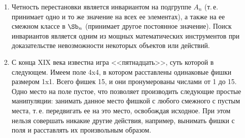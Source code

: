 \begin{enumerate}
\begin{table}[h!]
\begin{tabular}{c||c}
\footnotesize %
\begin{tabular}{cc|cc}
 $\id$    & (12)(34) & (13)(24) & (14)(23) \\[5pt]
 (12)(34) & $\id$    & (14)(23) & (13)(24) \\[3pt]\hline
 &&& \\[-5pt]
 (13)(24) & (14)(23) & $\id$    & (12)(34) \\[5pt]
 (14)(23) & (13)(24) & (12)(34) & $\id$
\end{tabular}
 &
\begin{tabular}{c|cccc}
$\sqrt[4]{1}$ & 1    & $i$  & $-1$ & $-i$ \\  \hline
1             & 1    & $i$  & $-1$ & $-i$ \\
$i$           & $i$  & $-1$ & $-i$ & 1    \\
$-1$          & $-1$ & $-i$ & 1    & $i$  \\
$-i$          & $-i$ & 1    & $i$  & $-1$
\end{tabular}
\\
\\

\hline

\end{tabular}
\caption{}\label{vier}
\end{table}

Отметим, что с точностью до изоморфизма существует всего две группы 4-го порядка: группа Клейна и циклическая группа. Несмотря на все разнообразие их представителей!




\subsection*{Игра <<Пятнадцать>>}


\item Четность перестановки является инвариантом на подгруппе $A_n$ (т.\,е. принимает одно и то же значение на всех ее элементах), а также на ее смежном классе в $\Sb_n$ (принимает другое постоянное значение). Поиск инвариантов является одним из мощных математических инструментов при  доказательстве невозможности некоторых объектов или действий.

\item С конца XIX века известна игра <<пятнадцать>>, суть которой в следующем. Имеем поле 4x4, в котором расставлены одинаковые фишки размером 1x1. Всего фишек 15, и они пронумерованы числами от 1 до 15. Одно место на поле пустое, что позволяет производить следующие простые манипуляции: занимать данное место фишкой с любого смежного с пустым места, т.\,е. передвигать ее на это место, освобождая исходное.
При этом нельзя совершать никакие другие действия, например, вынимать фишки с поля и расставлять их произвольным образом.


\end{enumerate}
